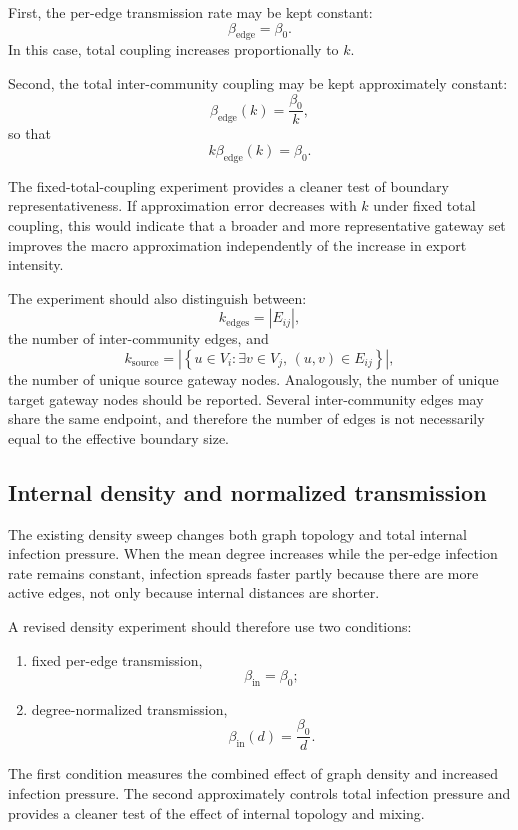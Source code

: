 \documentclass[12pt,a4paper]{article}
\begin{document}
First, the per-edge transmission rate may be kept constant:
\[
\beta_{\mathrm{edge}}=\beta_0.
\]
In this case, total coupling increases proportionally to \(k\).

Second, the total inter-community coupling may be kept approximately constant:
\[
\beta_{\mathrm{edge}}(k)
=
\frac{\beta_0}{k},
\]
so that
\[
k\beta_{\mathrm{edge}}(k)
=
\beta_0.
\]

The fixed-total-coupling experiment provides a cleaner test of boundary representativeness. If approximation error decreases with \(k\) under fixed total coupling, this would indicate that a broader and more representative gateway set improves the macro approximation independently of the increase in export intensity.

The experiment should also distinguish between:
\[
k_{\mathrm{edges}}
=
|E_{ij}|,
\]
the number of inter-community edges, and
\[
k_{\mathrm{source}}
=
\left|
\left\{
u\in V_i:
\exists v\in V_j,\,
(u,v)\in E_{ij}
\right\}
\right|,
\]
the number of unique source gateway nodes. Analogously, the number of unique target gateway nodes should be reported. Several inter-community edges may share the same endpoint, and therefore the number of edges is not necessarily equal to the effective boundary size.

\subsection{Internal density and normalized transmission}

The existing density sweep changes both graph topology and total internal infection pressure. When the mean degree increases while the per-edge infection rate remains constant, infection spreads faster partly because there are more active edges, not only because internal distances are shorter.

A revised density experiment should therefore use two conditions:
\begin{enumerate}
    \item fixed per-edge transmission,
    \[
    \beta_{\mathrm{in}}=\beta_0;
    \]
    \item degree-normalized transmission,
    \[
    \beta_{\mathrm{in}}(d)
    =
    \frac{\beta_0}{d}.
    \]
\end{enumerate}

The first condition measures the combined effect of graph density and increased infection pressure. The second approximately controls total infection pressure and provides a cleaner test of the effect of internal topology and mixing.
\end{document}
